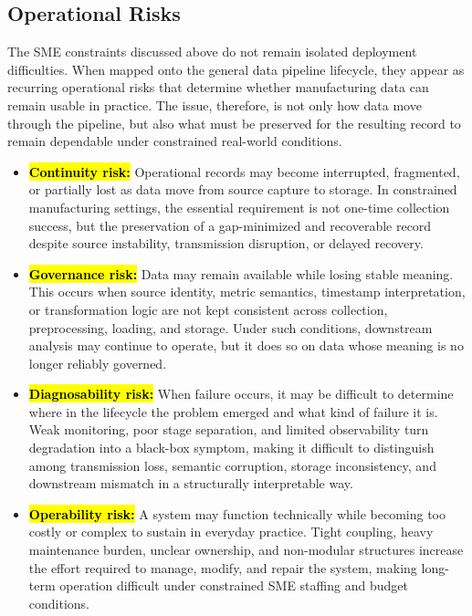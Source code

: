 \documentclass[systems,article,accept,pdftex,moreauthors]{Definitions/mdpi}
\begin{document}
\subsection{Operational Risks}
\label{sec:operational_risks}

The SME constraints discussed above do not remain isolated deployment difficulties. When mapped onto the general data pipeline lifecycle, they appear as recurring operational risks that determine whether manufacturing data can remain usable in practice. The issue, therefore, is not only how data move through the pipeline, but also what must be preserved for the resulting record to remain dependable under constrained real-world conditions.

\begin{itemize}[leftmargin=1.5em]
    \item[\textbf{\hl{RSK1.}}] \textbf{\hl{Continuity risk:}} %
    Operational records may become interrupted, fragmented, or partially lost as data move from source capture to storage. In constrained manufacturing settings, the essential requirement is not one-time collection success, but the preservation of a gap-minimized and recoverable record despite source instability, transmission disruption, or delayed recovery.

    \item[\textbf{\hl{RSK2.}}] \textbf{\hl{Governance risk:}} Data may remain available while losing stable meaning. This occurs when source identity, metric semantics, timestamp interpretation, or transformation logic are not kept consistent across collection, preprocessing, loading, and storage. Under such conditions, downstream analysis may continue to operate, but it does so on data whose meaning is no longer reliably governed.

    \item[\textbf{\hl{RSK3.}}] \textbf{\hl{Diagnosability risk:}} When failure occurs, it may be difficult to determine where in the lifecycle the problem emerged and what kind of failure it is. Weak monitoring, poor stage separation, and limited observability turn degradation into a black-box symptom, making it difficult to distinguish among transmission loss, semantic corruption, storage inconsistency, and downstream mismatch in a structurally interpretable way.

    \item[\textbf{\hl{RSK4.}}] \textbf{\hl{Operability risk:}} A system may function technically while becoming too costly or complex to sustain in everyday practice. Tight coupling, heavy maintenance burden, unclear ownership, and non-modular structures increase the effort required to manage, modify, and repair the system, making long-term operation difficult under constrained SME staffing and budget conditions.


\end{itemize}
\end{document}
